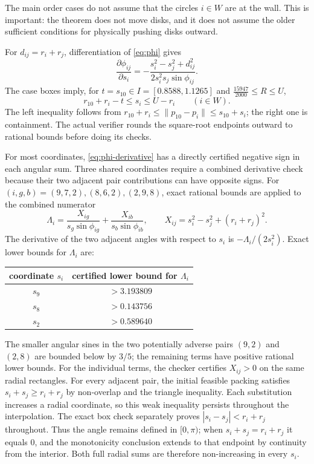 \documentclass[11pt,a4paper]{article}
\theoremstyle{remark}
\newcommand{\Rcap}{U}
\newcommand{\norm}[1]{\lVert #1\rVert}
\begin{document}
The main order cases do not assume that the circles $i\in W$ are at the wall.
This is important: the theorem does not move disks, and it does not assume
the older sufficient conditions for physically pushing disks outward.

For $d_{ij}=r_i+r_j$, differentiation of \eqref{eq:phi} gives
\begin{equation}
 \frac{\partial\phi_{ij}}{\partial s_i}
  =-\frac{s_i^2-s_j^2+d_{ij}^2}
          {2s_i^2s_j\sin\phi_{ij}}.
 \label{eq:phi-derivative}
\end{equation}
The case boxes imply, for $t=s_{10}\in I=[0.8588,1.1265]$ and
$\frac{15947}{2000}\le R\le\Rcap$,
\[
  r_{10}+r_i-t\le s_i\le \Rcap-r_i
       \qquad(i\in W).
 \label{eq:main-radial-box}
\]
The left inequality follows from
$r_{10}+r_i\le\norm{p_{10}-p_i}\le s_{10}+s_i$; the right one is
containment.  The actual verifier rounds the square-root endpoints outward
to rational bounds before doing its checks.

For most coordinates, \eqref{eq:phi-derivative} has a directly certified
negative sign in each angular sum.  Three shared coordinates require a
combined derivative check because their two adjacent pair contributions
can have opposite signs.  For $(i,g,b)=(9,7,2),(8,6,2),(2,9,8)$, exact
rational bounds are applied to the combined numerator
\[
 \Lambda_i=\frac{X_{ig}}{s_g\sin\phi_{ig}}
          +\frac{X_{ib}}{s_b\sin\phi_{ib}},
 \qquad X_{ij}=s_i^2-s_j^2+(r_i+r_j)^2.
\]
The derivative of the two adjacent angles with respect to $s_i$ is
$-\Lambda_i/(2s_i^2)$.  Exact lower bounds for $\Lambda_i$ are:
\begin{center}
\begin{tabular}{cc}
\toprule
coordinate $s_i$ & certified lower bound for $\Lambda_i$\\
\midrule
$s_9$ & $>3.193809$\\
$s_8$ & $>0.143756$\\
$s_2$ & $>0.589640$\\
\bottomrule
\end{tabular}
\end{center}
The smaller angular sines in the two potentially adverse pairs $(9,2)$ and
$(2,8)$ are bounded below by $3/5$; the remaining terms have positive
rational lower bounds.  For the individual terms, the checker certifies
$X_{ij}>0$ on the same radial rectangles.  For every adjacent pair, the
initial feasible packing satisfies $s_i+s_j\ge r_i+r_j$ by non-overlap and
the triangle inequality.  Each substitution increases a radial coordinate,
so this weak inequality persists throughout the interpolation.  The exact
box check separately proves $|s_i-s_j|<r_i+r_j$ throughout.  Thus the angle
remains defined in $[0,\pi)$; when $s_i+s_j=r_i+r_j$ it equals $0$, and the
monotonicity conclusion extends to that endpoint by continuity from the
interior.  Both full radial sums are therefore non-increasing in every
$s_i$.
\end{document}
